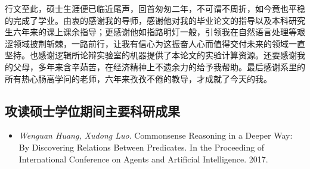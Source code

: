 \documentclass[UTF8,11pt,a4paper,nofonts]{ctexart}
\numberwithin{equation}{section}
\begin{document}
行文至此，硕士生涯便已临近尾声，回首匆匆二年，不可谓不周折，如今竟也平稳的完成了学业。由衷的感谢我的导师，感谢他对我的毕业论文的指导以及本科研究生六年来的课上课余指导；更感谢他如指路明灯一般，引领我在自然语言处理等艰涩领域披荆斩棘，一路前行，让我有信心为这振奋人心而值得交付未来的领域一直坚持。也感谢逻辑所论辩实验室的机器提供了本论文的实验计算资源。还要感谢我的父母，多年来含辛茹苦，在经济精神上不遗余力的给予我帮助。最后感谢系里的所有热心肠高学问的老师，六年来孜孜不倦的教导，才成就了今天的我。
\vspace{8 em}

\newpage
{}
\begin{center}
\section*{攻读硕士学位期间主要科研成果}
\end{center}

\begin{itemize}
\item \emph{Wenguan Huang, Xudong Luo}. Commonsense Reasoning in a Deeper Way: By
Discovering Relations Between Predicates. In the Proceeding of International
Conference on Agents and Artificial Intelligence. 2017.
\end{itemize}
\end{document}
